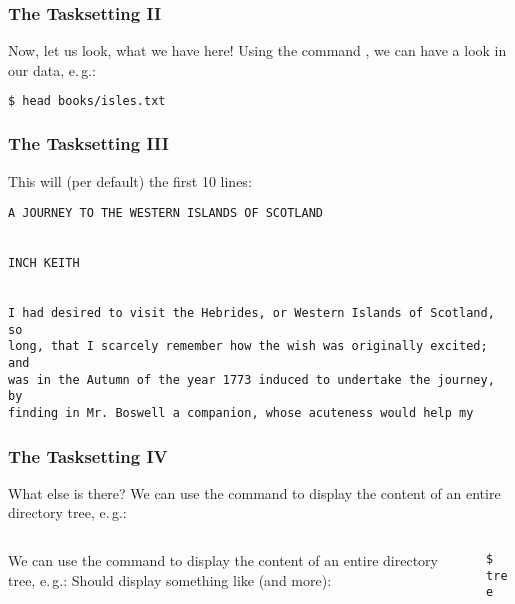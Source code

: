 \begin{frame}[fragile]
  \frametitle{The Tasksetting II}
  Now, let us look, what we have here!\newline
  Using the command , we can have a look in our data, e.\,g.:
  \begin{lstlisting}[language=Bash, style=Shell, basicstyle=\ttfamily\footnotesize]
$ head books/isles.txt
  \end{lstlisting}
\end{frame}

\begin{frame}[fragile]
  \frametitle{The Tasksetting III}
  This will (per default) the first 10 lines:
  \begin{lstlisting}[style=Plain, basicstyle=\ttfamily\tiny]
A JOURNEY TO THE WESTERN ISLANDS OF SCOTLAND


INCH KEITH


I had desired to visit the Hebrides, or Western Islands of Scotland, so
long, that I scarcely remember how the wish was originally excited; and
was in the Autumn of the year 1773 induced to undertake the journey, by
finding in Mr. Boswell a companion, whose acuteness would help my
  \end{lstlisting}
  \pause
\end{frame}

\begin{frame}[fragile]
  \frametitle{The Tasksetting IV}
  What else is there?\newline
  We can use the  command to display the content of an entire directory tree, e.\,g.:
  \begin{columns}
    \begin{column}{0.2\textwidth}
    \footnotesize
    We can use the  command to display the content of an entire directory tree, e.\,g.:\newline
     Should display something like (and more):
    \end{column}
    \begin{column}{0.8\textwidth}
    \begin{minipage}[t]{0.5\textwidth}
            {\tiny \DTsetlength{0.2em}{1em}{0.2em}{0.4pt}{.6pt}
\texttt{\$ tree}
}
    \end{minipage}


    \end{column}
  \end{columns}
\end{frame}

